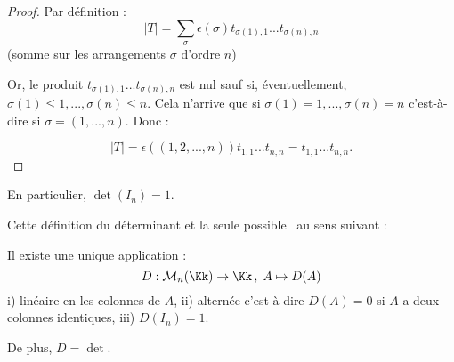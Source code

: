 \documentclass[class=report,crop=false]{standalone}
\begin{document}
\begin{proof}
Par définition :
\[|T| = \sum_{\sigma } \epsilon(\sigma)t_{\sigma(1),1}...t_{\sigma(n),n}\]
(somme sur les arrangements $\sigma$ d'ordre $n$)

Or, le produit $t_{\sigma(1),1}...t_{\sigma(n),n}$ est nul sauf si, éventuellement, $\sigma(1) \le 1 ,...,\sigma(n) \le n$. Cela n'arrive que si $\sigma(1) = 1,...,\sigma(n) = n$ c'est-à-dire si $\sigma = (1,...,n)$. Donc :

\[|T| = \epsilon((1,2,...,n))t_{1,1}...t_{n,n}= t_{1,1}...t_{n,n} .\]
\end{proof}

En particulier, $\det (I_n) = 1$.

Cette définition du déterminant et \og la seule possible \fg\ au sens suivant :

\begin{theoreme}\label{th:det1}
Il existe une unique application :
\[D : \mathcal{M}_n(\Kk) \to \Kk \,,\; A \mapsto D(A)\]
i) linéaire en les colonnes de $A$, ii) alternée c'est-à-dire $D(A) =0$ si $A$ a deux colonnes identiques, iii) $D(I_n) =1$.

De plus, $D = \det$.
\end{theoreme}
\end{document}
